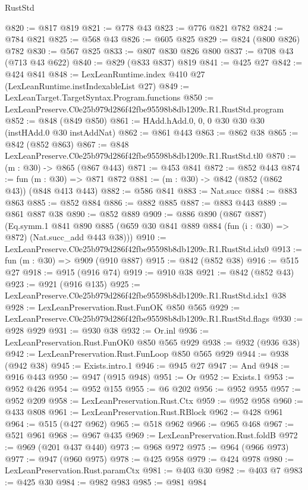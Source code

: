 \begin{lexlean}{RustStd}
\begin{coremodule}
@820 := @817 @819
@821 := @778 @43
@823 := @776 @821 @782
@824 := @784 @821
@825 := @568 @43
@826 := @605 @825
@829 := @824 (@800 @826) @782
@830 := @567 @825
@833 := @807 @830 @826 @800
@837 := @708 @43 (@713 @43 @622)
@840 := @829 (@833 @837) @819
@841 := @425 @27
@842 := @424 @841
@848 := LexLeanRuntime.index @410 @27 (LexLeanRuntime.instIndexableList @27)
@849 := LexLeanTarget.TargetSyntax.Program.functions
@850 := LexLeanPreserve.C0e25b979d286f42fbe95598b8db1209c.R1.RustStd.program
@852 := @848 (@849 @850)
@861 := HAdd.hAdd.{0, 0, 0} @30 @30 @30 (instHAdd.{0} @30 instAddNat)
@862 := @861 @443
@863 := @862 @38
@865 := @842 (@852 @863)
@867 := @848 LexLeanPreserve.C0e25b979d286f42fbe95598b8db1209c.R1.RustStd.tl0
@870 := (m : @30) -> @865 (@867 @443)
@871 := @453 @841
@872 := @852 @443
@874 := fun (m : @30) => @871 @872
@881 := (m : @30) -> @842 (@852 (@862 @43)) (@848 @413 @443)
@882 := @586 @841
@883 := Nat.succ
@884 := @883 @863
@885 := @852 @884
@886 := @882 @885
@887 := @883 @443
@889 := @861 @887 @38
@890 := @852 @889
@909 := @886
    @890
    (@867 @887)
    (Eq.symm.{1}
      @841
      @890
      @885
      (@659 @30 @841 @889 @884 (fun (i : @30) => @872) (Nat.succ_add @443 @38)))
@910 := LexLeanPreserve.C0e25b979d286f42fbe95598b8db1209c.R1.RustStd.idx0
@913 := fun (m : @30) => @909 (@910 @887)
@915 := @842 (@852 @38)
@916 := @515 @27
@918 := @915 (@916 @74)
@919 := @910 @38
@921 := @842 (@852 @43)
@923 := @921 (@916 @135)
@925 := LexLeanPreserve.C0e25b979d286f42fbe95598b8db1209c.R1.RustStd.idx1 @38
@928 := LexLeanPreservation.Rust.FunOK @850 @565
@929 := LexLeanPreserve.C0e25b979d286f42fbe95598b8db1209c.R1.RustStd.flags
@930 := @928 @929
@931 := @930 @38
@932 := Or.inl
@936 := LexLeanPreservation.Rust.FunOK0 @850 @565 @929
@938 := @932 (@936 @38)
@942 := LexLeanPreservation.Rust.FunLoop @850 @565 @929
@944 := @938 (@942 @38)
@945 := Exists.intro.{1}
@946 := @945 @27
@947 := And
@948 := @916 @443
@950 := @947 (@915 @948)
@951 := Or
@952 := Exists.{1}
@953 := @952 @426
@954 := @952 @155
@955 := @6 @202
@956 := @952 @955
@957 := @952 @209
@958 := LexLeanPreservation.Rust.Ctx
@959 := @952 @958
@960 := @433 @808
@961 := LexLeanPreservation.Rust.RBlock
@962 := @428 @961
@964 := @515 (@427 @962)
@965 := @518 @962
@966 := @965 @468
@967 := @521 @961
@968 := @967 @435
@969 := LexLeanPreservation.Rust.foldB
@972 := @969 (@201 @437 @440)
@973 := @968 @972
@975 := @964 (@966 @973)
@977 := @947 (@960 @975)
@978 := @425 @958
@979 := @424 @978
@980 := LexLeanPreservation.Rust.paramCtx
@981 := @403 @30
@982 := @403 @7
@983 := @425 @30
@984 := @982 @983
@985 := @981 @984

\end{coremodule}
\end{lexlean}

